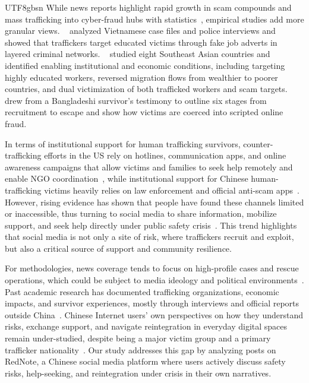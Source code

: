 \documentclass[sigconf,nonacm]{acmart}
\newcommand{\rev}[1]{#1}
\newcommand{\add}[1]{#1}
\begin{document}
\begin{CJK}{UTF8}{gbsn}
\add{While news reports highlight rapid growth in scam compounds and mass trafficking into cyber-fraud hubs with statistics~\cite{McPherson2025, Ratcliffe2025GuardianMyanmarScam, Xinhua2025Feb, Xinhua2023Aug}, empirical studies add more granular views. \citeauthor{luong2025simple}~\cite{luong2025simple} analyzed Vietnamese case files and police interviews and showed that traffickers target educated victims through fake job adverts in layered criminal networks. \citeauthor{jesperson2023trafficking}~\cite{jesperson2023trafficking} studied eight Southeast Asian countries and identified enabling institutional and economic conditions, including targeting highly educated workers, reversed migration flows from wealthier to poorer countries, and dual victimization of both trafficked workers and scam targets. \citeauthor{lazarus2025assessing}~\cite{lazarus2025assessing} drew from a Bangladeshi survivor's testimony to outline six stages from recruitment to escape and show how victims are coerced into scripted online fraud.}

\rev{In terms of institutional support for human trafficking survivors, counter-trafficking efforts in the US rely on hotlines, communication apps, and online awareness campaigns that allow victims and families to seek help remotely and enable NGO coordination~\cite{feeney2024evaluation}, while institutional support for Chinese human-trafficking victims heavily relies on law enforcement and official anti-scam apps~\cite{han_new_2019, xue2023internet}. However, rising evidence has shown that people have found these channels limited or inaccessible, thus turning to social media to share information, mobilize support, and seek help directly under public safety crisis~\cite{peterson2019officialsystems, saud2020usage, bbcNews-25}.} This trend highlights that social media is not only a site of risk, where traffickers recruit and exploit, but also a critical source of support and community resilience.

\add{For methodologies, news coverage tends to focus on high-profile cases and rescue operations, which could be subject to media ideology and political environments~\cite{stroud2008media}. Past academic research has documented trafficking organizations, economic impacts, and survivor experiences, mostly through interviews and official reports outside China~\cite{jesperson2023trafficking, luong2024understanding, luong2025simple, lazarus2025assessing}. Chinese Internet users' own perspectives on how they understand risks, exchange support, and navigate reintegration in everyday digital spaces remain under-studied, despite being a major victim group and a primary trafficker nationality~\cite{luong2025simple}. Our study addresses this gap by analyzing posts on RedNote, a Chinese social media platform where users actively discuss safety risks, help-seeking, and reintegration under crisis in their own narratives.}


\end{CJK}
\end{document}
